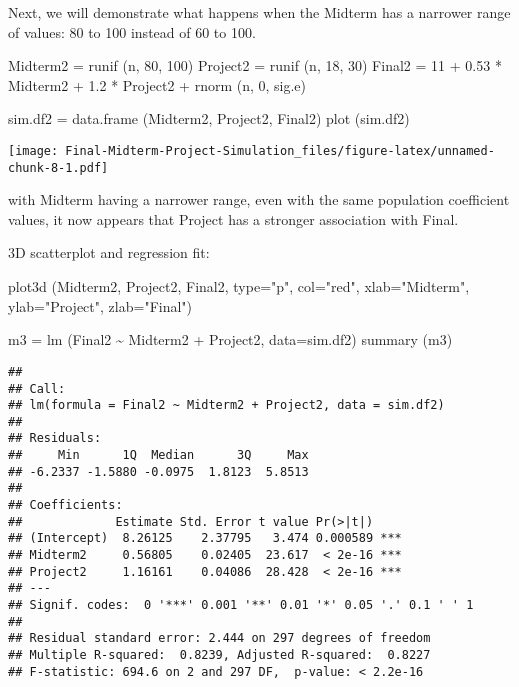 \documentclass[
]{article}
\newenvironment{Shaded}{\begin{snugshade}}{\end{snugshade}}
\newcommand{\AttributeTok}[1]{\textcolor[rgb]{0.77,0.63,0.00}{#1}}
\newcommand{\DecValTok}[1]{\textcolor[rgb]{0.00,0.00,0.81}{#1}}
\newcommand{\FloatTok}[1]{\textcolor[rgb]{0.00,0.00,0.81}{#1}}
\newcommand{\FunctionTok}[1]{\textcolor[rgb]{0.00,0.00,0.00}{#1}}
\newcommand{\NormalTok}[1]{#1}
\newcommand{\OtherTok}[1]{\textcolor[rgb]{0.56,0.35,0.01}{#1}}
\newcommand{\SpecialCharTok}[1]{\textcolor[rgb]{0.00,0.00,0.00}{#1}}
\newcommand{\StringTok}[1]{\textcolor[rgb]{0.31,0.60,0.02}{#1}}
\begin{document}
Next, we will demonstrate what happens when the Midterm has a narrower
range of values: 80 to 100 instead of 60 to 100.

\begin{Shaded}
\begin{Highlighting}[]
\NormalTok{Midterm2 }\OtherTok{=} \FunctionTok{runif}\NormalTok{ (n, }\DecValTok{80}\NormalTok{, }\DecValTok{100}\NormalTok{)}
\NormalTok{Project2 }\OtherTok{=} \FunctionTok{runif}\NormalTok{ (n, }\DecValTok{18}\NormalTok{, }\DecValTok{30}\NormalTok{)}
\NormalTok{Final2 }\OtherTok{=} \DecValTok{11} \SpecialCharTok{+} \FloatTok{0.53} \SpecialCharTok{*}\NormalTok{ Midterm2 }\SpecialCharTok{+} \FloatTok{1.2} \SpecialCharTok{*}\NormalTok{ Project2 }\SpecialCharTok{+} \FunctionTok{rnorm}\NormalTok{ (n, }\DecValTok{0}\NormalTok{, sig.e)}

\NormalTok{sim.df2 }\OtherTok{=} \FunctionTok{data.frame}\NormalTok{ (Midterm2, Project2, Final2)}
\FunctionTok{plot}\NormalTok{ (sim.df2)}
\end{Highlighting}
\end{Shaded}

\texttt{[image: Final-Midterm-Project-Simulation\_files/figure-latex/unnamed-chunk-8-1.pdf]}

with Midterm having a narrower range, even with the same population
coefficient values, it now appears that Project has a stronger
association with Final.

3D scatterplot and regression fit:

\begin{Shaded}
\begin{Highlighting}[]
\FunctionTok{plot3d}\NormalTok{ (Midterm2, Project2, Final2, }\AttributeTok{type=}\StringTok{"p"}\NormalTok{, }\AttributeTok{col=}\StringTok{"red"}\NormalTok{, }
        \AttributeTok{xlab=}\StringTok{"Midterm"}\NormalTok{, }\AttributeTok{ylab=}\StringTok{"Project"}\NormalTok{, }\AttributeTok{zlab=}\StringTok{"Final"}\NormalTok{)}

\NormalTok{m3 }\OtherTok{=} \FunctionTok{lm}\NormalTok{ (Final2 }\SpecialCharTok{\textasciitilde{}}\NormalTok{ Midterm2 }\SpecialCharTok{+}\NormalTok{ Project2, }\AttributeTok{data=}\NormalTok{sim.df2)}
\FunctionTok{summary}\NormalTok{ (m3)}
\end{Highlighting}
\end{Shaded}

\begin{verbatim}
## 
## Call:
## lm(formula = Final2 ~ Midterm2 + Project2, data = sim.df2)
## 
## Residuals:
##     Min      1Q  Median      3Q     Max 
## -6.2337 -1.5880 -0.0975  1.8123  5.8513 
## 
## Coefficients:
##             Estimate Std. Error t value Pr(>|t|)    
## (Intercept)  8.26125    2.37795   3.474 0.000589 ***
## Midterm2     0.56805    0.02405  23.617  < 2e-16 ***
## Project2     1.16161    0.04086  28.428  < 2e-16 ***
## ---
## Signif. codes:  0 '***' 0.001 '**' 0.01 '*' 0.05 '.' 0.1 ' ' 1
## 
## Residual standard error: 2.444 on 297 degrees of freedom
## Multiple R-squared:  0.8239, Adjusted R-squared:  0.8227 
## F-statistic: 694.6 on 2 and 297 DF,  p-value: < 2.2e-16
\end{verbatim}
\end{document}
